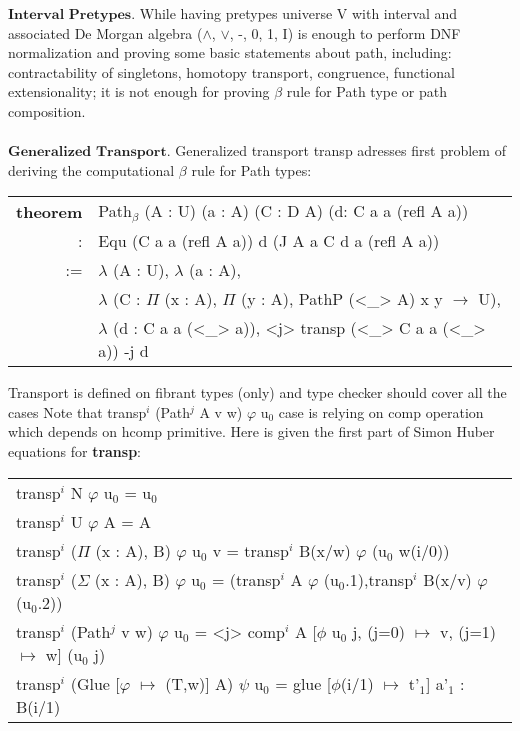 \documentclass[a4paper,UKenglish,cleveref, autoref, thm-restate]{lipics-v2021}
\newcommand{\tabstyle}[0]{\scriptsize\ttfamily\fontseries{l}\selectfont}
\begin{document}
$\textbf{Interval\ Pretypes}$. While having pretypes universe V with interval and
associated De Morgan algebra ($\wedge$, $\vee$, -, 0, 1, I) is enough to
perform DNF normalization and proving some basic statements about path, including:
contractability of singletons, homotopy transport, congruence, functional
extensionality; it is not enough for proving $\beta$ rule for Path type or path composition.
\\
\\
\indent $\textbf{Generalized\ Transport}$. Generalized transport transp adresses
first problem of deriving the computational $\beta$ rule for Path types:

\begin{table}[ht]
\tabstyle
\begin{tabular}{rl}
\textbf{theorem} & Path$_\beta$ (A : U) (a : A) (C : D A) (d: C a a (refl A a)) \\
               : & Equ (C a a (refl A a)) d (J A a C d a (refl A a)) \\
              := & $\lambda$ (A : U), $\lambda$ (a : A), \\
                 & $\lambda$ (C : $\Pi$ (x : A), $\Pi$ (y : A), PathP (<\_> A) x y $\rightarrow$ U), \\
                 & $\lambda$ (d : C a a (<\_> a)), <j> transp (<\_> C a a (<\_> a)) -j d \\
\end{tabular}
\end{table}

Transport is defined on fibrant types (only) and type checker should cover all the cases
Note that transp$^i$ (Path$^j$ A v w) $\varphi$ u$_0$ case is relying on comp
operation which depends on hcomp primitive. Here is given the first part of Simon Huber equations \cite{Huber} for \textbf{transp}:

\begin{table}[ht]
\tabstyle
\begin{tabular}{l}
transp$^{i}$ N $\varphi$ u$_0$ = u$_0$ \\
transp$^{i}$ U $\varphi$ A = A \\
transp$^{i}$ ($\Pi$ (x : A), B) $\varphi$ u$_0$ v = transp$^i$ B(x/w) $\varphi$ (u$_0$ w(i/0)) \\
transp$^{i}$ ($\Sigma$ (x : A), B) $\varphi$ u$_0$ = (transp$^i$ A $\varphi$ (u$_0$.1),transp$^i$ B(x/v) $\varphi$ (u$_0$.2)) \\
transp$^{i}$ (Path$^j$ v w) $\varphi$ u$_0$ = <j> comp$^i$ A [$\phi$ u$_0$ j, (j=0) $\mapsto$ v, (j=1) $\mapsto$ w] (u$_0$ j) \\
transp$^{i}$ (Glue [$\varphi$ $\mapsto$ (T,w)] A) $\psi$ u$_0$ = glue [$\phi$(i/1) $\mapsto$ t'$_1$] a'$_1$ : B(i/1) \\
\end{tabular}
\end{table}
\end{document}
